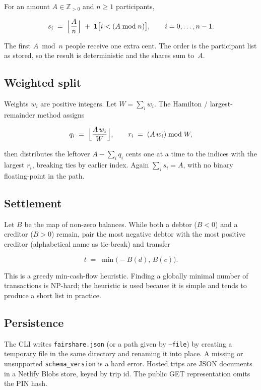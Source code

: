 \documentclass[11pt,a4paper]{article}
\newcommand{\code}[1]{\texttt{#1}}
\begin{document}
For an amount $A \in \mathbb{Z}_{>0}$ and $n \ge 1$ participants,

\begin{equation}
  s_i \;=\; \Bigl\lfloor \frac{A}{n} \Bigr\rfloor
  \;+\;
  \mathbf{1}\bigl[i < (A \bmod n)\bigr],
  \qquad i = 0,\ldots,n-1.
\end{equation}

The first $A \bmod n$ people receive one extra cent.
The order is the participant list as stored, so the result is deterministic and the shares sum to~$A$.

\subsection{Weighted split}

Weights $w_i$ are positive integers.
Let $W = \sum_i w_i$.
The Hamilton / largest-remainder method assigns

\begin{equation}
  q_i \;=\; \Bigl\lfloor \frac{A\, w_i}{W} \Bigr\rfloor,
  \qquad
  r_i \;=\; (A\, w_i) \bmod W,
\end{equation}

then distributes the leftover $A - \sum_i q_i$ cents one at a time to the indices with the largest $r_i$, breaking ties by earlier index.
Again $\sum_i s_i = A$, with no binary floating-point in the path.

\subsection{Settlement}

Let $B$ be the map of non-zero balances.
While both a debtor ($B < 0$) and a creditor ($B > 0$) remain, pair the most negative debtor with the most positive creditor (alphabetical name as tie-break) and transfer

\begin{equation}
  t \;=\; \min\bigl(-B(d),\, B(c)\bigr).
\end{equation}

This is a greedy min-cash-flow heuristic.
Finding a globally minimal number of transactions is NP-hard; the heuristic is used because it is simple and tends to produce a short list in practice.

\subsection{Persistence}

The CLI writes \code{fairshare.json} (or a path given by \code{--file}) by creating a temporary file in the same directory and renaming it into place.
A missing or unsupported \code{schema\_version} is a hard error.
Hosted trips are JSON documents in a Netlify Blobs store, keyed by trip id.
The public GET representation omits the PIN hash.
\end{document}
